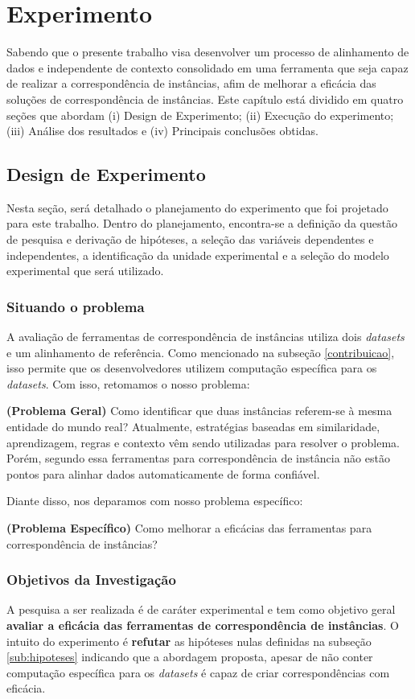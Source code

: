\chapter{Experimento}
\label{cap:experimento}
Sabendo que o presente trabalho visa desenvolver um processo de alinhamento de dados  e  independente de contexto consolidado em uma ferramenta que seja capaz de realizar a correspondência de instâncias, afim de melhorar a eficácia das soluções de correspondência de instâncias. Este capítulo está dividido em quatro seções que abordam (i) Design de Experimento; (ii) Execução do experimento; (iii) Análise dos resultados e (iv) Principais conclusões obtidas.

\section{Design de Experimento}
Nesta seção, será detalhado o planejamento do experimento que foi projetado para este trabalho. Dentro do planejamento, encontra-se a definição da questão de pesquisa e derivação de hipóteses, a seleção das variáveis dependentes e independentes, a identificação da unidade experimental e a seleção do modelo experimental que será utilizado.

\subsection{Situando o problema}
A avaliação de ferramentas de correspondência de instâncias utiliza dois \textit{datasets} e um alinhamento de referência. Como mencionado na subseção \ref{contribuicao}, isso permite que os desenvolvedores utilizem computação específica para os \textit{datasets}. Com isso, retomamos o nosso problema:

\textbf{(Problema Geral)} Como identificar que duas instâncias referem-se à mesma entidade do mundo real?
Atualmente, estratégias baseadas em similaridade, aprendizagem, regras e contexto \cite{castano2011ontology} vêm sendo utilizadas para resolver o problema. Porém, segundo  essa ferramentas para correspondência de instância não estão pontos para alinhar dados automaticamente de forma confiável. 

Diante disso, nos deparamos com nosso problema específico: 

\textbf{(Problema Específico)} Como melhorar a eficácias das ferramentas para correspondência de instâncias?

\subsection{Objetivos da Investigação}
A pesquisa a ser realizada é de caráter experimental e tem como objetivo geral \textbf{avaliar a eficácia das ferramentas de correspondência de instâncias}. O intuito do experimento é \textbf{refutar} as hipóteses nulas definidas na subseção \ref{sub:hipoteses} indicando que a abordagem proposta, apesar de não conter computação específica para os \textit{datasets} é capaz de criar correspondências com eficácia.

